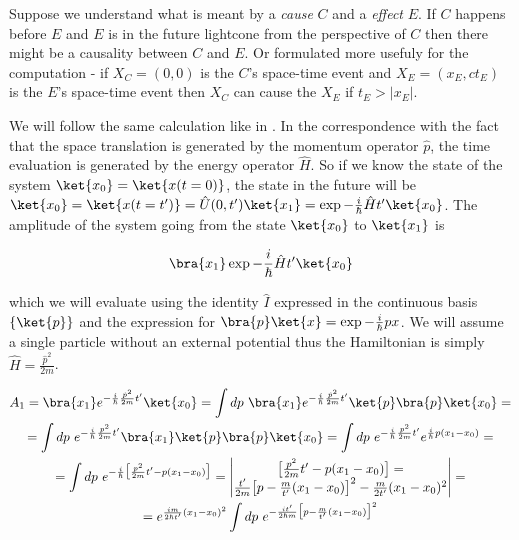 \begin{definition}
    \label{df:causality}
    Suppose we understand what is meant by a \textit{cause} $C$ and a \textit{effect} $E$. If $C$ happens before $E$ and 
    $E$ is in the future lightcone from the perspective of $C$ then there might be a causality between $C$ and $E$.  Or
    formulated more usefuly for the computation - if $X_{C} = (0, 0)$ is the $C$'s space-time event and 
    $X_{E} = (x_{E}, ct_{E})$ is the $E$'s space-time event then $X_{C}$ can cause the $X_{E}$ if $t_{E} > |x_{E}|$.
\end{definition}

We will follow the same calculation like in \cite{peskin_schroeder}. In the correspondence with the fact that the space translation
is generated by the momentum operator $\hat{p}$, the time evaluation is generated by the energy operator $\hat{H}$. So
if we know the state of the system $\ket{x_{0}} = \ket{x(t=0)}$, the state in the future will be 
$\ket{x_{0}} = \ket{x(t=t')} = \hat{U}(0, t') \ket{x_{1}} = \exp{- \frac{i}{\hbar} \hat{H} t'} \ket{x_{0}}$. The amplitude of the
system going from the state $\ket{x_{0}}$ to $\ket{x_{1}}$ is 

\begin{equation}
    \bra{x_{1}} \exp{- \frac{i}{\hbar} \hat{H} t'}\ket{x_{0}}
\end{equation}

which we will evaluate using the identity $\hat{I}$ expressed in the continuous basis $\{\ket{p}\}$ and the expression for
$\bra{p}\ket{x} = \exp{- \frac{i}{\hbar} p x}$. We will assume a single particle without an external potential thus the
Hamiltonian is simply $\hat{H} = \frac{\hat{p}^{2}}{2m}$.

\begin{equation*}
    \begin{gathered}
        A_{1} = \bra{x_{1}} e^{- \frac{i}{\hbar} \frac{\hat{p}^{2}}{2m} t'}\ket{x_{0}} = \int dp \ \bra{x_{1}} e^{- \frac{i}{\hbar} \frac{\hat{p}^{2}}{2m} t'}\ket{p} \bra{p} \ket{x_{0}} = \\
        = \int dp \ e^{- \frac{i}{\hbar} \frac{p^{2}}{2m} t'} \bra{x_{1}}\ket{p} \bra{p} \ket{x_{0}} = \int dp \ e^{- \frac{i}{\hbar} \frac{p^{2}}{2m} t'} e^{\frac{i}{\hbar}p (x_{1} - x_{0})} = \\
        = \int dp \ e^{- \frac{i}{\hbar} \big[\frac{p^{2}}{2m} t' - p (x_{1} - x_{0})\big]} = 
        \begin{vmatrix}
            \big[\frac{p^{2}}{2m} t' - p (x_{1} - x_{0})\big] =  \\
            \frac{t'}{2m} \big[p - \frac{m}{t'}(x_{1} - x_{0})\big]^{2} - \frac{m}{2t'}(x_{1} - x_{0})^{2} \\
        \end{vmatrix} = \\
        = e^{\frac{im}{2\hbar t'} (x_{1} - x_{0})^{2}} \int dp \ e^{- \frac{i t'}{2 \hbar m} \big[p - \frac{m}{t'}(x_{1} - x_{0})\big]^{2}} \\
    \end{gathered}
\end{equation*}

